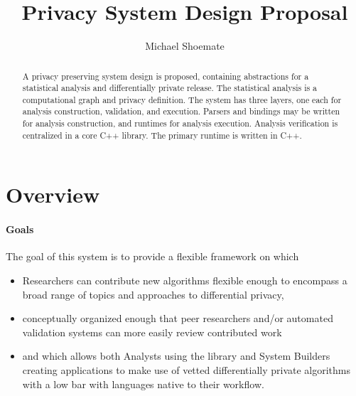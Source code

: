 \documentclass[11pt]{article}
\begin{document}
\title{Privacy System Design Proposal}
\author{Michael Shoemate}

\maketitle

\begin{abstract}
A privacy preserving system design is proposed, containing abstractions for a statistical analysis and differentially private release. The statistical analysis is a computational graph and privacy definition. The system has three layers, one each for analysis construction, validation, and execution. Parsers and bindings may be written for analysis construction, and runtimes for analysis execution. Analysis verification is centralized in a core C++ library. The primary runtime is written in C++.
\end{abstract}

\section{Overview}
\paragraph{Goals}  The goal of this system is to provide a flexible framework on which
\begin{itemize}
    \item Researchers can contribute new algorithms flexible enough to encompass a broad range of topics and approaches to differential privacy, 
    \item conceptually organized enough that peer researchers and/or automated validation systems can more easily review contributed work 
    \item and which allows both Analysts using the library and System Builders creating applications to make use of vetted differentially private algorithms with a low bar with languages native to their workflow.
\end{itemize}



\end{document}
